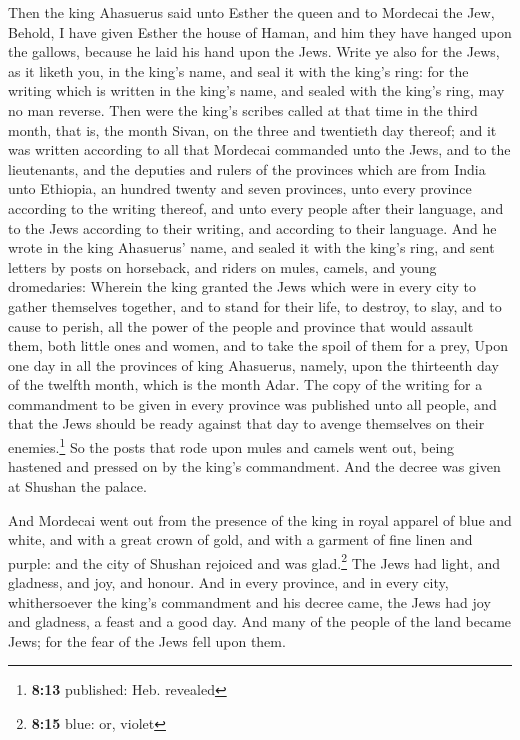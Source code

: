  Then the king Ahasuerus said unto Esther the queen and to
Mordecai the Jew, Behold, I have given Esther the house of Haman, and
him they have hanged upon the gallows, because he laid his hand upon the
Jews.  Write ye also for the Jews, as it liketh you, in
the king's name, and seal it with the king's ring: for the writing which
is written in the king's name, and sealed with the king's ring, may no
man reverse.  Then were the king's scribes called at that
time in the third month, that is, the month Sivan, on the three and
twentieth day thereof; and it was written according to all that Mordecai
commanded unto the Jews, and to the lieutenants, and the deputies and
rulers of the provinces which are from India unto Ethiopia, an hundred
twenty and seven provinces, unto every province according to the writing
thereof, and unto every people after their language, and to the Jews
according to their writing, and according to their language.
 And he wrote in the king Ahasuerus' name, and sealed it
with the king's ring, and sent letters by posts on horseback, and riders
on mules, camels, and young dromedaries:  Wherein the
king granted the Jews which were in every city to gather themselves
together, and to stand for their life, to destroy, to slay, and to cause
to perish, all the power of the people and province that would assault
them, both little ones and women, and to take the spoil of them for a
prey,  Upon one day in all the provinces of king
Ahasuerus, namely, upon the thirteenth day of the twelfth month, which
is the month Adar.  The copy of the writing for a
commandment to be given in every province was published unto all people,
and that the Jews should be ready against that day to avenge themselves
on their enemies.\footnote{\textbf{8:13} published: Heb. revealed}
 So the posts that rode upon mules and camels went out,
being hastened and pressed on by the king's commandment. And the decree
was given at Shushan the palace.

 And Mordecai went out from the presence of the king in
royal apparel of blue and white, and with a great crown of gold, and
with a garment of fine linen and purple: and the city of Shushan
rejoiced and was glad.\footnote{\textbf{8:15} blue: or, violet}
 The Jews had light, and gladness, and joy, and honour.
 And in every province, and in every city, whithersoever
the king's commandment and his decree came, the Jews had joy and
gladness, a feast and a good day. And many of the people of the land
became Jews; for the fear of the Jews fell upon them.

